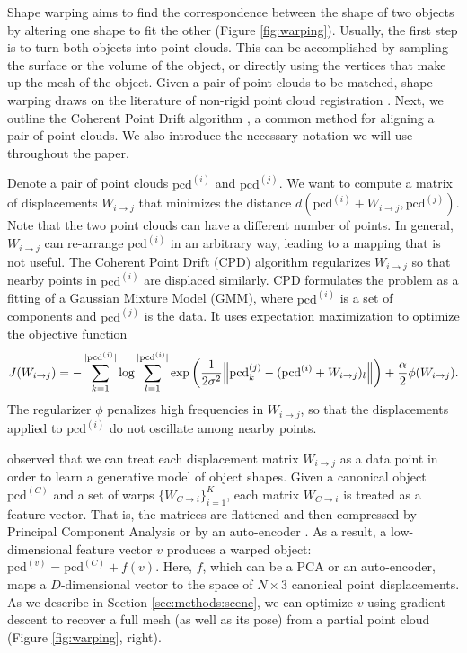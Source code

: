 \documentclass{article}
\newcommand{\rob}[1]{\textcolor{green}{[\textbf{rob:} #1]}}
\newcommand{\pcx}[1]{\mathrm{pcd}^{(#1)}}
\newcommand{\wxy}[2]{W_{#1 \rightarrow #2}}
\newcommand{\pci}{\pcx{i}}
\newcommand{\pcj}{\pcx{j}}
\newcommand{\pcc}{\pcx{C}}
\newcommand{\wij}{\wxy{i}{j}}
\newcommand{\wci}{\wxy{C}{i}}
\begin{document}
Shape warping aims to find the correspondence between the shape of two objects by altering one shape to fit the other (Figure \ref{fig:warping}). Usually, the first step is to turn both objects into point clouds. This can be accomplished by sampling the surface or the volume of the object, or directly using the vertices that make up the mesh of the object. Given a pair of point clouds to be matched, shape warping draws on the literature of non-rigid point cloud registration \cite{huang21comprehensive}. Next, we outline the Coherent Point Drift algorithm \cite{manuelli20keypoints}, a common method for aligning a pair of point clouds. We also introduce the necessary notation we will use throughout the paper.

Denote a pair of point clouds $\pci$ and $\pcj$. We want to compute a matrix of displacements $\wij$ that minimizes the distance $d\left( \pci + \wij, \pcj \right)$. Note that the two point clouds can have a different number of points. In general, $\wij$ can re-arrange $\pci$ in an arbitrary way, leading to a mapping that is not useful. The Coherent Point Drift (CPD) algorithm regularizes $\wij$ so that nearby points in $\pci$ are displaced similarly. CPD formulates the problem as a fitting of a Gaussian Mixture Model (GMM), where $\pci$ is a set of components and $\pcj$ is the data. It uses expectation maximization to optimize the objective function
\begin{align}
    J(\wij) = - \sum_{k=1}^{|\pcj|} \log \sum_{l=1}^{|\pci|} \exp \left( \frac{1}{2 \sigma^2} \norm{\pcj_k - (\pci + \wij)_l} \right) + \frac{\alpha}{2} \phi(\wij).
\end{align}
The regularizer $\phi$ penalizes high frequencies in $\wij$, so that the displacements applied to $\pci$ do not oscillate among nearby points.

\citet{rodriguez18transferring,thompson21shapebased} observed that we can treat each displacement matrix $\wij$ as a data point in order to learn a generative model of object shapes. Given a canonical object $\pcc$ and a set of warps $\{ \wci \}_{i=1}^K$, each matrix $\wci$ is treated as a feature vector. That is, the matrices are flattened and then compressed by Principal Component Analysis \cite{rodriguez18transferring,rodriguez18transferringa,thompson21shapebased} or by an auto-encoder \cite{thompson21shapebased}. As a result, a low-dimensional feature vector $v$ produces a warped object: $\pcx{v} = \pcc + f(v)$. Here, $f$, which can be a PCA or an auto-encoder, maps a $D$-dimensional vector to the space of $N{\times}3$ canonical point displacements. As we describe in Section \ref{sec:methods:scene}, we can optimize $v$ using gradient descent to recover a full mesh (as well as its pose) from a partial point cloud (Figure \ref{fig:warping}, right).
\end{document}
